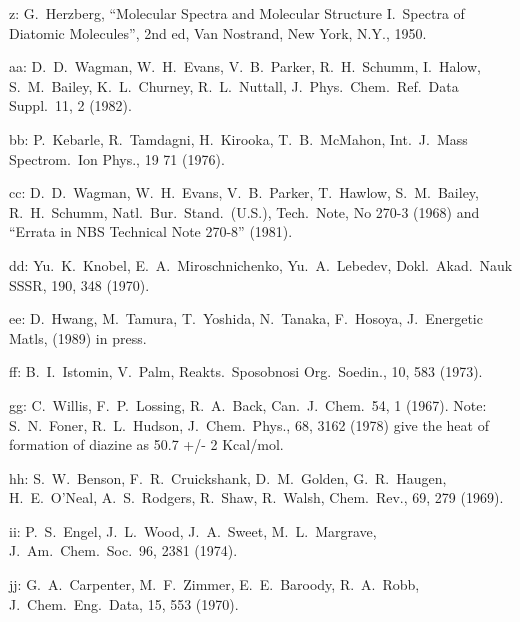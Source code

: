 \begin{description}
\item{   z: } G.\ Herzberg, ``Molecular Spectra and Molecular Structure I.\ Spectra of
       Diatomic Molecules'', 2nd ed, Van Nostrand, New York, N.Y., 1950.
  
\item{  aa: } D.\ D.\ Wagman, W.\ H.\ Evans, V.\ B.\ Parker, R.\ H.\ Schumm, I.\ Halow,
       S.\ M.\ Bailey, K.\ L.\ Churney, R.\ L.\ Nuttall, J.\ Phys.\ Chem.\
       Ref.\ Data Suppl.\ 11, 2 (1982).
  
\item{  bb: } P.\ Kebarle, R.\ Tamdagni, H.\ Kirooka, T.\ B.\ McMahon, Int.\ J.\ Mass Spectrom.\
       Ion Phys., 19 71 (1976).
  
\item{  cc: } D.\ D.\ Wagman, W.\ H.\ Evans, V.\ B.\ Parker, T.\ Hawlow, S.\ M.\ Bailey,
       R.\ H.\ Schumm, Natl.\ Bur.\ Stand.\ (U.S.), Tech.\ Note, No 270-3 (1968)
       and ``Errata in NBS Technical Note 270-8'' (1981).
  
\item{  dd: } Yu.\ K.\ Knobel, E.\ A.\ Miroschnichenko, Yu.\ A.\ Lebedev, Dokl.\ Akad.\ Nauk
       SSSR, 190, 348 (1970).
  
\item{  ee: } D.\ Hwang, M.\ Tamura, T.\ Yoshida, N.\ Tanaka, F.\ Hosoya, J.\ Energetic
       Matls, (1989) in press.
  
\item{  ff: } B.\ I.\ Istomin, V.\ Palm, Reakts.\ Sposobnosi Org.\ Soedin., 10, 583 (1973).
  
\item{  gg: } C.\ Willis, F.\ P.\ Lossing, R.\ A.\ Back, Can.\ J.\ Chem.\ 54, 1 (1967). Note:
       S.\ N.\ Foner, R.\ L.\ Hudson, J.\ Chem.\ Phys., 68, 3162 (1978) give the
       heat of formation of diazine as 50.7 +/- 2 Kcal/mol.
  
\item{  hh: } S.\ W.\ Benson, F.\ R.\ Cruickshank, D.\ M.\ Golden, G.\ R.\ Haugen, H.\ E.\ O'Neal,
       A.\ S.\ Rodgers, R.\ Shaw, R.\ Walsh, Chem.\ Rev., 69, 279 (1969).
  
\item{  ii: } P.\ S.\ Engel, J.\ L.\ Wood, J.\ A.\ Sweet, M.\ L.\ Margrave, J.\ Am.\ Chem.\ Soc.\
       96, 2381 (1974).
  
\item{  jj: } G.\ A.\ Carpenter, M.\ F.\ Zimmer, E.\ E.\ Baroody, R.\ A.\ Robb, J.\ Chem.\ Eng.\
       Data, 15, 553 (1970).
  

\end{description}
